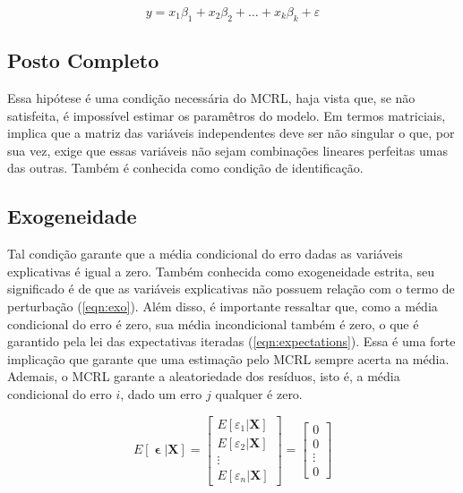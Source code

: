 \documentclass[a4paper,12pt]{article}
\begin{document}
\begin{equation}
\label{eqn:linear}
y = x_1 \beta_1 + x_2 \beta_2 + \dots + x_k \beta_k + \varepsilon
\end{equation}

\hypertarget{posto-completo}{%
\subsection{Posto Completo}\label{posto-completo}}

Essa hipótese é uma condição necessária do MCRL, haja vista que, se não
satisfeita, é impossível estimar os paramêtros do modelo. Em termos
matriciais, implica que a matriz das variáveis independentes deve ser
não singular o que, por sua vez, exige que essas variáveis não sejam
combinações lineares perfeitas umas das outras. Também é conhecida como
condição de identificação.

\hypertarget{exogeneidade}{%
\subsection{Exogeneidade}\label{exogeneidade}}

Tal condição garante que a média condicional do erro dadas as variáveis
explicativas é igual a zero. Também conhecida como exogeneidade estrita,
seu significado é de que as variáveis explicativas não possuem relação
com o termo de perturbação (\ref{eqn:exo}). Além disso, é importante
ressaltar que, como a média condicional do erro é zero, sua média
incondicional também é zero, o que é garantido pela lei das expectativas
iteradas (\ref{eqn:expectations}). Essa é uma forte implicação que
garante que uma estimação pelo MCRL sempre acerta na média. Ademais, o
MCRL garante a aleatoriedade dos resíduos, isto é, a média condicional
do erro \(i\), dado um erro \(j\) qualquer é zero.

\begin{equation}
\label{eqn:exo}
E[\mbfvarepsilon | \textbf{X}] = \begin{bmatrix} E[\varepsilon_1 | \textbf{X}] \\ E[\varepsilon_2 | \textbf{X}] \\ \vdots \\ E[\varepsilon_n | \textbf{X}] \end{bmatrix} = \begin{bmatrix} 0 \\ 0 \\ \vdots \\ 0 \end{bmatrix}
\end{equation}
\end{document}
